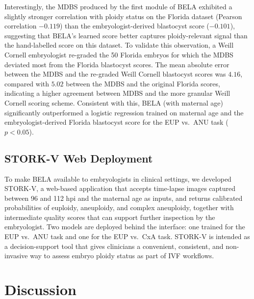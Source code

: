 \documentclass[11pt,a4paper]{article}
\begin{document}
Interestingly, the MDBS produced by the first module of BELA exhibited a
slightly stronger correlation with ploidy status on the Florida dataset
(Pearson correlation $-0.119$) than the embryologist-derived blastocyst
score ($-0.101$), suggesting that BELA's learned score better captures
ploidy-relevant signal than the hand-labelled score on this dataset. To
validate this observation, a Weill Cornell embryologist re-graded the 50
Florida embryos for which the MDBS deviated most from the Florida
blastocyst scores. The mean absolute error between the MDBS and the
re-graded Weill Cornell blastocyst scores was $4.16$, compared with
$5.02$ between the MDBS and the original Florida scores, indicating a
higher agreement between MDBS and the more granular Weill Cornell
scoring scheme. Consistent with this, BELA (with maternal age)
significantly outperformed a logistic regression trained on maternal age
and the embryologist-derived Florida blastocyst score for the EUP vs.\
ANU task ($p < 0.05$).

\subsection{STORK-V Web Deployment}

To make BELA available to embryologists in clinical settings, we developed
STORK-V, a web-based application that accepts time-lapse images captured
between 96 and 112 hpi and the maternal age as inputs, and returns
calibrated probabilities of euploidy, aneuploidy, and complex aneuploidy,
together with intermediate quality scores that can support further
inspection by the embryologist. Two models are deployed behind the
interface: one trained for the EUP vs.\ ANU task and one for the EUP
vs.\ CxA task. STORK-V is intended as a decision-support tool that gives
clinicians a convenient, consistent, and non-invasive way to assess
embryo ploidy status as part of IVF workflows.

\section{Discussion}\label{sec:discussion}
\end{document}
